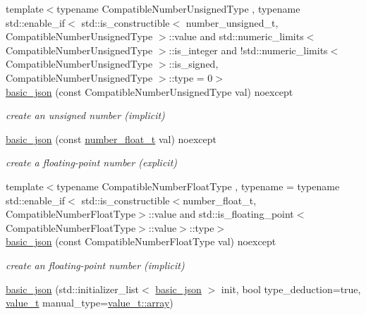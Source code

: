 \begin{DoxyCompactItemize}
{\footnotesize template$<$typename Compatible\+Number\+Unsigned\+Type , typename std\+::enable\+\_\+if$<$                                                                      std\+::is\+\_\+constructible$<$ number\+\_\+unsigned\+\_\+t, Compatible\+Number\+Unsigned\+Type $>$\+::value and                                                                   std\+::numeric\+\_\+limits$<$ Compatible\+Number\+Unsigned\+Type $>$\+::is\+\_\+integer and                                                                   !std\+::numeric\+\_\+limits$<$ Compatible\+Number\+Unsigned\+Type $>$\+::is\+\_\+signed,                                                                   Compatible\+Number\+Unsigned\+Type $>$\+::type  = 0$>$ }\\\hyperlink{a00025_a68a5f34b164a07b8ced13fcf2b7ec834}{basic\+\_\+json} (const Compatible\+Number\+Unsigned\+Type val) noexcept
\begin{DoxyCompactList}\small\item\em create an unsigned number (implicit) \end{DoxyCompactList}\item 
\hyperlink{a00025_a2badcf191deabf579abcf8d3654da26f}{basic\+\_\+json} (const \hyperlink{a00025_a74a0013e847fdc574b48f931f0e757e1}{number\+\_\+float\+\_\+t} val) noexcept
\begin{DoxyCompactList}\small\item\em create a floating-\/point number (explicit) \end{DoxyCompactList}\item 
{\footnotesize template$<$typename Compatible\+Number\+Float\+Type , typename  = typename std\+::enable\+\_\+if$<$                 std\+::is\+\_\+constructible$<$number\+\_\+float\+\_\+t, Compatible\+Number\+Float\+Type$>$\+::value and                 std\+::is\+\_\+floating\+\_\+point$<$\+Compatible\+Number\+Float\+Type$>$\+::value$>$\+::type$>$ }\\\hyperlink{a00025_a4bbdfd6dd8d2e6fc9ac5d81ef61ba3fe}{basic\+\_\+json} (const Compatible\+Number\+Float\+Type val) noexcept
\begin{DoxyCompactList}\small\item\em create an floating-\/point number (implicit) \end{DoxyCompactList}\item 
\hyperlink{a00025_afeb998aec45296bc2050bd1c41ef41eb}{basic\+\_\+json} (std\+::initializer\+\_\+list$<$ \hyperlink{a00025}{basic\+\_\+json} $>$ init, bool type\+\_\+deduction=true, \hyperlink{a00025_a231b02148577b69a154b2ce2c87a5522}{value\+\_\+t} manual\+\_\+type=\hyperlink{a00025_a231b02148577b69a154b2ce2c87a5522af1f713c9e000f5d3f280adbd124df4f5}{value\+\_\+t\+::array})

\end{DoxyCompactItemize}
